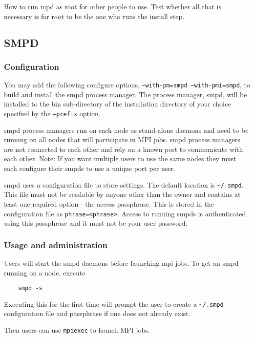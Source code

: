 \documentclass[dvipdfm,11pt]{article}
\begin{document}
How to run mpd as root for other people to use.  Test whether all that
is necessary is for root to be the one who runs the install step.

\subsection{SMPD}
\label{sec:smpd}

\subsubsection{Configuration}
\label{sec:smpd_configure}

You may add the following configure options, 
\texttt{--with-pm=smpd --with-pmi=smpd}, 
to build and install the smpd process manager. The process manager, smpd, 
will be installed to the bin sub-directory of the installation directory 
of your choice specified by the \texttt{--prefix} option.

smpd process managers run on each node as stand-alone daemons and need to
be running on all nodes that will participate in MPI jobs.  smpd process 
managers are not connected to each other and rely on a known port to 
communicate with each other.  Note: If you want multiple users to use the 
same nodes they must each configure their smpds to use a unique port per 
user. 

smpd uses a configuration file to store settings.  The default location is 
\verb+~/.smpd+.  This file must not be readable by anyone other than 
the owner and contains at least one required option - the access passphrase.
This is stored in the configuration file as \texttt{phrase=<phrase>}. Access 
to running smpds is authenticated using this passphrase and it must 
not be your user password.

\subsubsection{Usage and administration}
\label{sec:smpd_usage}

Users will start the smpd daemons before launching mpi jobs.  To get an 
smpd running on a node, execute 
\begin{verbatim}
    smpd -s
\end{verbatim}
Executing this for the first time will prompt the user to create a 
\verb+~/.smpd+ configuration file and passphrase if one does not 
already exist.

Then users can use \texttt{mpiexec} to launch MPI jobs.
\end{document}
